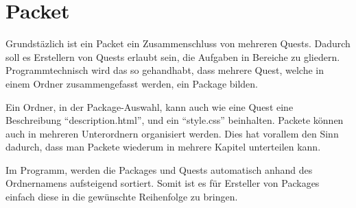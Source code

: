 \section{Packet}
Grundstäzlich ist ein Packet ein Zusammenschluss von mehreren Quests. Dadurch soll es Erstellern von Quests erlaubt sein, die Aufgaben in Bereiche zu gliedern. Programmtechnisch wird das so gehandhabt, dass mehrere Quest, welche in einem Ordner zusammengefasst werden, ein Package bilden.

Ein Ordner, in der Package-Auswahl, kann auch wie eine Quest eine Beschreibung “description.html”, und ein “style.css” beinhalten. Packete können auch in mehreren Unterordnern organisiert werden. Dies hat vorallem den Sinn dadurch, dass man Packete wiederum in mehrere Kapitel unterteilen kann.

Im Programm, werden die Packages und Quests automatisch anhand des Ordnernamens aufsteigend sortiert. Somit ist es für Ersteller von Packages einfach diese in die gewünschte Reihenfolge zu bringen.

